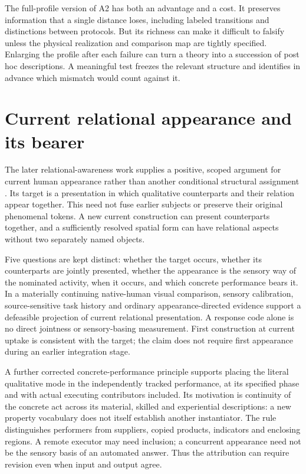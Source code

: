 The full-profile version of A2 has both an advantage and a cost. It preserves information that a single distance loses, including labeled transitions and distinctions between protocols. But its richness can make it difficult to falsify unless the physical realization and comparison map are tightly specified. Enlarging the profile after each failure can turn a theory into a succession of post hoc descriptions. A meaningful test freezes the relevant structure and identifies in advance which mismatch would count against it.

\section{Current relational appearance and its bearer}\label{sec:current-relational-appearance}
The later relational-awareness work supplies a positive, scoped argument for current human appearance rather than another conditional structural assignment \cite{RodgersRelationalAwareness2026}. Its target is a presentation in which qualitative counterparts and their relation appear together. This need not fuse earlier subjects or preserve their original phenomenal tokens. A new current construction can present counterparts together, and a sufficiently resolved spatial form can have relational aspects without two separately named objects.

Five questions are kept distinct: whether the target occurs, whether its counterparts are jointly presented, whether the appearance is the sensory way of the nominated activity, when it occurs, and which concrete performance bears it. In a materially continuing native-human visual comparison, sensory calibration, source-sensitive task history and ordinary appearance-directed evidence support a defeasible projection of current relational presentation. A response code alone is no direct jointness or sensory-basing measurement. First construction at current uptake is consistent with the target; the claim does not require first appearance during an earlier integration stage.

A further corrected concrete-performance principle supports placing the literal qualitative mode in the independently tracked performance, at its specified phase and with actual executing contributors included. Its motivation is continuity of the concrete act across its material, skilled and experiential descriptions: a new property vocabulary does not itself establish another instantiator. The rule distinguishes performers from suppliers, copied products, indicators and enclosing regions. A remote executor may need inclusion; a concurrent appearance need not be the sensory basis of an automated answer. Thus the attribution can require revision even when input and output agree.


